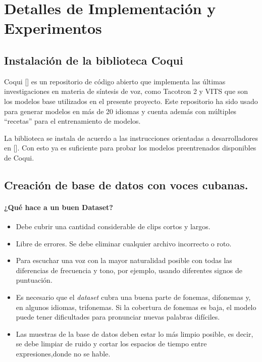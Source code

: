 \chapter{Detalles de Implementación y Experimentos}\label{chapter:implementation}

\section{Instalación de la biblioteca Coqui}
Coqui [\cite{coqui-doc}] es un repositorio de código abierto que implementa las últimas investigaciones en materia de síntesis de voz, como Tacotron 2 y VITS que son los modelos base utilizados en el presente proyecto. Este repositorio ha sido usado para generar modelos en más de 20 idiomas  y cuenta además con múltiples ``recetas'' para el entrenamiento de modelos. 

La biblioteca se instala de acuerdo a las instrucciones orientadas a desarrolladores en [\cite{coqui-doc}].
Con esto ya es suficiente para probar los modelos preentrenados disponibles de Coqui.


\section{Creación de base de datos con voces cubanas.}

\subsubsection{¿Qué hace a un buen Dataset?}

\begin{itemize}
	\item Debe cubrir una cantidad considerable de clips cortos y largos.
	\item Libre de errores. Se debe eliminar cualquier archivo incorrecto o roto. 
	\item Para escuchar una voz con la mayor naturalidad posible con todas las diferencias de frecuencia y tono, por ejemplo, usando diferentes signos de puntuación.
	\item Es necesario que el \textit{dataset} cubra una buena parte de fonemas, difonemas y, en algunos idiomas, trifonemas. Si la cobertura de fonemas es baja, el modelo puede tener dificultades para pronunciar nuevas palabras difíciles.
	\item Las muestras de la base de datos deben estar lo más limpio posible, es decir, se debe limpiar de ruido y cortar los espacios de tiempo entre expresiones,donde no se hable.
	
\end{itemize}


